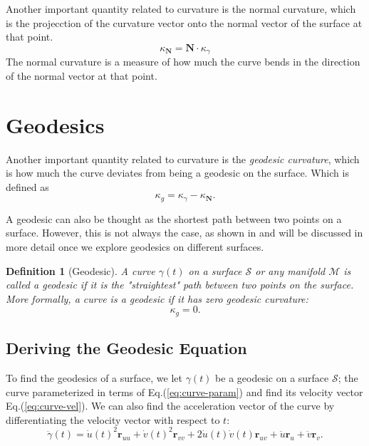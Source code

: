 \documentclass[12pt]{article}
\newtheorem{definition}{Definition}[section]
\begin{document}
Another important quantity related to curvature is the normal curvature, which is the projecction of the curvature vector onto the normal vector of the surface at that point.
\[
	\kappa_{\mathbf{N}} = \mathbf{N} \cdot \kappa_{\gamma}
\]
The normal curvature is a measure of how much the curve bends in the direction of the normal vector at that point.


\section{Geodesics}

Another important quantity related to curvature is the \emph{geodesic curvature}, which is how much the curve deviates from being a geodesic on the surface.
Which is defined as 
\begin{equation}\label{eq:geodesic-curvature}
	\kappa_{g} = \kappa_{\gamma} - \kappa_{\mathbf{N}}.
\end{equation}

A geodesic can also be thought as the shortest path between two points on a surface.
However, this is not always the case, as shown in \cite{jia2024geodesics} and will be discussed in more detail once we explore geodesics on different surfaces.

\begin{definition}[Geodesic]\label{def:geodesic}
	A curve $\gamma(t)$ on a surface $\mathcal{S}$ or any manifold $\mathcal{M}$ is called a \emph{geodesic} if it is the "straightest" path between two points on the surface.
	More formally, a curve is a geodesic if it has zero geodesic curvature:
	\[
	\kappa_{g} = 0.
	\]
\end{definition}

\subsection{Deriving the Geodesic Equation}

To find the geodesics of a surface, we let $\gamma(t)$ be a geodesic on a surface $\mathcal{S}$; the curve parameterized in terms of Eq.(\ref{eq:curve-param}) and find its velocity vector Eq.(\ref{eq:curve-vel}).
We can also find the acceleration vector of the curve by differentiating the velocity vector with respect to $t$:
\begin{equation}\label{eq:curve-acc}
	\ddot\gamma(t) = \dot{u}(t)^{2}\mathbf{r}_{uu} + \dot{v}(t)^{2}\mathbf{r}_{vv} + 2\dot{u}(t)\dot{v}(t)\mathbf{r}_{uv} + \ddot{u}\mathbf{r}_{u} + \ddot{v}\mathbf{r}_{v}.
\end{equation}
\end{document}
